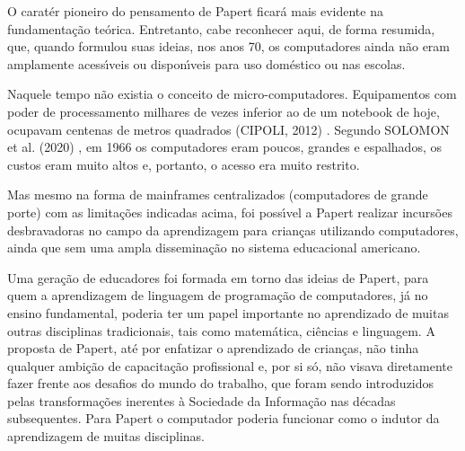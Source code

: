 \documentclass[
12pt,		%
openright,	%
twoside,  %
a4paper,			%
chapter=TITLE,		%
english,			%
french,				%
spanish,			%
brazil				%
]{USPSC-classe/USPSC}
\begin{document}
O carat\'er pioneiro do pensamento de Papert ficar\'a mais evidente na fundamenta\c{c}\~ao te\'orica. Entretanto, cabe reconhecer aqui, de forma resumida, que, quando formulou suas ideias, nos anos 70, os computadores  ainda n\~ao eram amplamente acess\'{\i}veis ou dispon\'{\i}veis para uso dom\'estico ou nas escolas.









Naquele tempo n\~ao existia o conceito de \textquotedbl micro-computadores\textquotedbl . Equipamentos com poder de processamento milhares de vezes inferior ao de um notebook de hoje, ocupavam centenas de metros quadrados  (CIPOLI, 2012) . Segundo  SOLOMON et al. (2020) , \textquotedbl em 1966 os computadores eram poucos, grandes e espalhados\textquotedbl , os custos eram muito altos e, portanto, o acesso era muito restrito.









Mas mesmo na forma de mainframes centralizados (computadores de grande porte) com as limita\c{c}\~oes indicadas acima, foi poss\'{\i}vel a Papert realizar incurs\~oes desbravadoras no campo da aprendizagem para crian\c{c}as utilizando computadores, ainda que sem uma ampla dissemina\c{c}\~ao no sistema educacional americano.









Uma gera\c{c}\~ao de educadores foi formada em torno das ideias de Papert, para quem a aprendizagem de linguagem de programa\c{c}\~ao de computadores, j\'a no ensino fundamental, poderia ter um papel importante no aprendizado de muitas outras disciplinas tradicionais, tais como matem\'atica, ci\^encias e linguagem. A proposta de Papert, at\'e por enfatizar o aprendizado de crian\c{c}as, n\~ao tinha qualquer ambi\c{c}\~ao de capacita\c{c}\~ao profissional e, por si s\'o, n\~ao visava diretamente fazer frente aos desafios do \textquotedbl mundo do trabalho\textquotedbl , que foram sendo introduzidos pelas transforma\c{c}\~oes inerentes \`a Sociedade da Informa\c{c}\~ao nas d\'ecadas subsequentes. Para Papert o computador poderia funcionar como o indutor da aprendizagem de muitas disciplinas.
\end{document}
